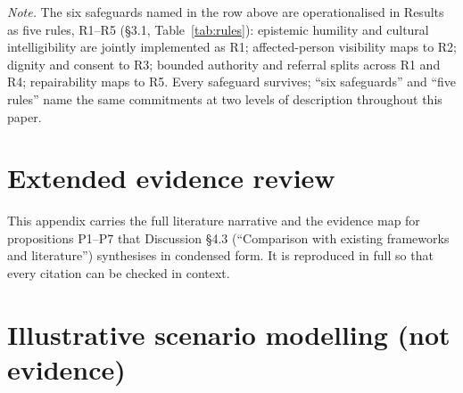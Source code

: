 \documentclass[10pt,twocolumn]{article}
\begin{document}
\noindent\footnotesize\textit{Note.} The six safeguards named in the row above are operationalised in Results as five rules, R1--R5 (\S3.1, Table~\ref{tab:rules}): epistemic humility and cultural intelligibility are jointly implemented as R1; affected-person visibility maps to R2; dignity and consent to R3; bounded authority and referral splits across R1 and R4; repairability maps to R5. Every safeguard survives; ``six safeguards'' and ``five rules'' name the same commitments at two levels of description throughout this paper.

\section{Extended evidence review}
\footnotesize
This appendix carries the full literature narrative and the evidence map for propositions P1--P7 that Discussion \S4.3 (``Comparison with existing frameworks and literature'') synthesises in condensed form. It is reproduced in full so that every citation can be checked in context.



\section{Illustrative scenario modelling (not evidence)}
\footnotesize

\end{document}
